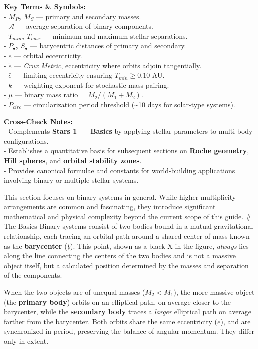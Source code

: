 \documentclass[
  letterpaper,
]{book}
\begin{document}
\textbf{Key Terms \& Symbols:}\\
- \textbf{\(M_P\), \(M_S\)} --- primary and secondary masses.\\
- \textbf{\(\mathcal{A}\)} --- average separation of binary
components.\\
- \textbf{\(T_{min}\), \(T_{max}\)} --- minimum and maximum stellar
separations.\\
- \textbf{\(P_\bullet\), \(S_\bullet\)} --- barycentric distances of
primary and secondary.\\
- \textbf{\(e\)} --- orbital eccentricity.\\
- \textbf{\(\acute{e}\)} --- \emph{Crux Metric}, eccentricity where
orbits adjoin tangentially.\\
- \textbf{\(\bar{e}\)} --- limiting eccentricity ensuring
\(T_{min} ≥ 0.10\) AU.\\
- \textbf{\(k\)} --- weighting exponent for stochastic mass pairing.\\
- \textbf{\(\mu\)} --- binary mass ratio = \(M_2 / (M_1 + M_2)\).\\
- \textbf{\(P_{circ}\)} --- circularization period threshold
(\textasciitilde10 days for solar-type systems).

\textbf{Cross-Check Notes:}\\
- Complements \textbf{Stars 1 --- Basics} by applying stellar parameters
to multi-body configurations.\\
- Establishes a quantitative basis for subsequent sections on
\textbf{Roche geometry}, \textbf{Hill spheres}, and \textbf{orbital
stability zones}.\\
- Provides canonical formulae and constants for world-building
applications involving binary or multiple stellar systems.

This section focuses on binary systems in general. While
higher-multiplicity arrangements are common and fascinating, they
introduce significant mathematical and physical complexity beyond the
current scope of this guide. \# The Basics Binary systems consist of two
bodies bound in a mutual gravitational relationship, each tracing an
orbital path around a shared center of mass known as the
\textbf{barycenter} (\emph{ḅ}). This point, \textbar\textbar shown as a
black X in the figure\textbar\textbar, \emph{always} lies along the line
connecting the centers of the two bodies and is not a massive object
itself, but a calculated position determined by the masses and
separation of the components.

When the two objects are of unequal masses (\(M_2 < M_1\)), the more
massive object (the \textbf{primary body}) orbits on an elliptical path,
on average closer to the barycenter, while the \textbf{secondary body}
traces a \emph{larger} elliptical path on average farther from the
barycenter. Both orbits share the same eccentricity (\(e\)), and are
synchronized in period, preserving the balance of angular momentum. They
differ only in extent.
\end{document}
